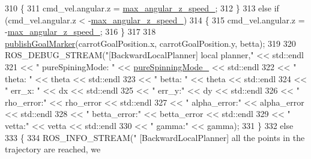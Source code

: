 \begin{DoxyCode}
{310                 \{
311                     cmd\_vel.angular.z = \hyperlink{classcl__move__base__z_1_1backward__local__planner_1_1BackwardLocalPlanner_af7e492339ee2d1c90c00f6dd4cf95551}{max\_angular\_z\_speed\_};
312                 \}
313                 \textcolor{keywordflow}{else} \textcolor{keywordflow}{if} (cmd\_vel.angular.z < -\hyperlink{classcl__move__base__z_1_1backward__local__planner_1_1BackwardLocalPlanner_af7e492339ee2d1c90c00f6dd4cf95551}{max\_angular\_z\_speed\_})
314                 \{
315                     cmd\_vel.angular.z = -\hyperlink{classcl__move__base__z_1_1backward__local__planner_1_1BackwardLocalPlanner_af7e492339ee2d1c90c00f6dd4cf95551}{max\_angular\_z\_speed\_};
316                 \}
317 
318                 \hyperlink{classcl__move__base__z_1_1backward__local__planner_1_1BackwardLocalPlanner_a70eaeb6cf31fd3378d9fbf9bcb975995}{publishGoalMarker}(carrotGoalPosition.x, carrotGoalPosition.y, betta);
319 
320                 ROS\_DEBUG\_STREAM(\textcolor{stringliteral}{"[BackwardLocalPlanner] local planner,"} << std::endl
321                                                 << \textcolor{stringliteral}{" pureSpiningMode: "} << 
      \hyperlink{classcl__move__base__z_1_1backward__local__planner_1_1BackwardLocalPlanner_aebc89ccfa79fdf6bd45ba35134bec3fb}{pureSpinningMode\_} << std::endl
322                                                 << \textcolor{stringliteral}{" theta: "} << theta << std::endl
323                                                 << \textcolor{stringliteral}{" betta: "} << theta << std::endl
324                                                 << \textcolor{stringliteral}{" err\_x: "} << dx << std::endl
325                                                 << \textcolor{stringliteral}{" err\_y:"} << dy << std::endl
326                                                 << \textcolor{stringliteral}{" rho\_error:"} << rho\_error << std::endl
327                                                 << \textcolor{stringliteral}{" alpha\_error:"} << alpha\_error << std::endl
328                                                 << \textcolor{stringliteral}{" betta\_error:"} << betta\_error << std::endl
329                                                 << \textcolor{stringliteral}{" vetta:"} << vetta << std::endl
330                                                 << \textcolor{stringliteral}{" gamma:"} << gamma);
331             \}
332             \textcolor{keywordflow}{else}
333             \{
334                 ROS\_INFO\_STREAM(\textcolor{stringliteral}{" [BackwardLocalPlanner] all the points in the trajectory are reached, we
}}
\end{DoxyCode}
